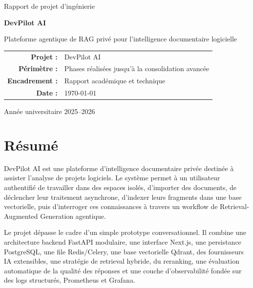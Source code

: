 \documentclass[12pt,a4paper,oneside]{report}
\begin{document}
\begin{titlepage}
  \centering
  \vspace*{1cm}
  {\Large Rapport de projet d'ingénierie\par}
  \vspace{1.5cm}
  {\Huge\bfseries\color{DevPilotBlue} DevPilot AI\par}
  \vspace{0.5cm}
  {\Large Plateforme agentique de RAG privé pour l'intelligence documentaire logicielle\par}
  \vspace{1.2cm}
  \vfill
  \begin{tabular}{rl}
    \textbf{Projet :} & DevPilot AI \\
    \textbf{Périmètre :} & Phases réalisées jusqu'à la consolidation avancée \\
    \textbf{Encadrement :} & Rapport académique et technique \\
    \textbf{Date :} & \today
  \end{tabular}
  \vfill
  {\large Année universitaire 2025--2026\par}
\end{titlepage}


\chapter*{Résumé}
DevPilot AI est une plateforme d'intelligence documentaire privée destinée à assister l'analyse de projets logiciels. Le système permet à un utilisateur authentifié de travailler dans des espaces isolés, d'importer des documents, de déclencher leur traitement asynchrone, d'indexer leurs fragments dans une base vectorielle, puis d'interroger ces connaissances à travers un workflow de Retrieval-Augmented Generation agentique.

Le projet dépasse le cadre d'un simple prototype conversationnel. Il combine une architecture backend FastAPI modulaire, une interface Next.js, une persistance PostgreSQL, une file Redis/Celery, une base vectorielle Qdrant, des fournisseurs IA extensibles, une stratégie de retrieval hybride, du reranking, une évaluation automatique de la qualité des réponses et une couche d'observabilité fondée sur des logs structurés, Prometheus et Grafana.
\end{document}
